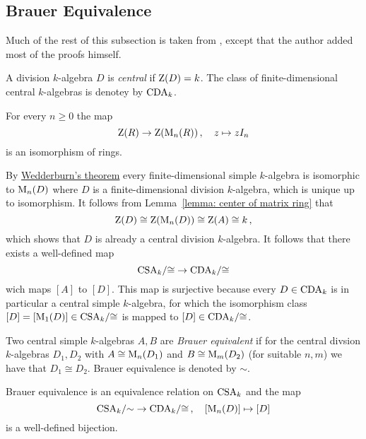 \subsection{Brauer Equivalence}


\begin{fluff}
  Much of the rest of this subsection is taken from \cite[4.2]{Clark2012NonCA}, except that the author added most of the proofs himself.
\end{fluff}


\begin{definition}
  A division $k$-algebra $D$ is \emph{central} if $\operatorname{Z}(D) = k$.
  The class of finite-dimensional central $k$-algebras is denotey by $\operatorname{CDA}_k$.
\end{definition}


\begin{lemma}
  \label{lemma: center of matrix ring}
  For every $n \geq 0$ the map
  \[
            \operatorname{Z}(R)
    \to     \operatorname{Z}(\operatorname{M}_n(R))  \,,
    \quad   z
    \mapsto z I_n
  \]
  is an isomorphism of rings.
\end{lemma}


\begin{fluff}
  By \hyperref[theorem: wedderburns theorem]{Wedderburn’s theorem} every finite-dimensional simple $k$-algebra is isomorphic to $\operatorname{M}_n(D)$ where $D$ is a finite-dimensional division $k$-algebra, which is unique up to isomorphism.
  It follows from Lemma~\ref{lemma: center of matrix ring} that
  \[
          \operatorname{Z}(D)
    \cong \operatorname{Z}(\operatorname{M}_n(D))
    \cong \operatorname{Z}(A)
    \cong k \,,
  \]
  which shows that $D$ is already a central division $k$-algebra.
  It follows that there exists a well-defined map
  \[
        \operatorname{CSA}_k\!/{\cong}
    \to \operatorname{CDA}_k\!/{\cong}
  \]
  wich maps $[A]$ to $[D]$.
  This map is surjective because every $D \in \operatorname{CDA}_k$ is in particular a central simple $k$-algebra, for which the isomorphism class $[D] = [\operatorname{M}_1(D)] \in \operatorname{CSA}_k\!/{\cong}$ is mapped to $[D] \in \operatorname{CDA}_k\!/{\cong}$.
\end{fluff}


\begin{definition}
  Two central simple $k$-algebras $A, B$ are \emph{Brauer equivalent} if for the central divsion $k$-algebras $D_1, D_2$ with $A \cong \operatorname{M}_n(D_1)$ and $B \cong \operatorname{M}_m(D_2)$ (for suitable $n, m$) we have that $D_1 \cong D_2$.
  Brauer equivalence is denoted by $\sim$.
\end{definition}


\begin{corollary}
  Brauer equivalence is an equivalence relation on $\operatorname{CSA}_k$ and the map
  \[
        \operatorname{CSA}_k\!/{\sim}
    \to \operatorname{CDA}_k\!/{\cong} \,,
    \quad   [\operatorname{M}_n(D)]
    \mapsto [D]
  \]
  is a well-defined bijection.
\end{corollary}


